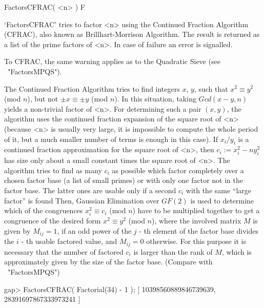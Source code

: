 
\>FactorsCFRAC( <n> ) F

`FactorsCFRAC' tries to factor <n> using the Continued Fraction
Algorithm (CFRAC), also known as Brillhart-Morrison Algorithm. 
The result is returned as a list of the prime factors of <n>.
In case of failure an error is signalled.

To CFRAC, the same warning applies 
as to the Quadratic Sieve (see ~"FactorsMPQS").

The Continued Fraction Algorithm tries to find integers $x$, $y$,
such that $x^2 \equiv y^2$ (mod $n$), but not $\pm x \equiv \pm y$
(mod $n$). In this situation, taking $Gcd(x - y,n)$ yields a 
non-trivial factor of <n>. For determining such a pair $(x,y)$, 
the algorithm uses the continued fraction expansion of the square root
of <n> (because <n> is usually very large, it is impossible to compute
the whole period of it, but a much smaller number of terms is enough
in this case). If $x_i/y_i$ is a
continued fraction approximation for the square root of <n>,
then $c_i := x_i^2 - ny_i^2$ has size only about a small constant times
the square root of <n>.
The algorithm tries to find as many $c_i$ as possible which factor 
completely over a chosen
factor base 
(a list of small primes) or with only one factor not in the factor base.
The latter ones are usable only if a second $c_i$ with the same
``large factor'' is found
Then,
Gaussian Elimination over $GF(2)$ 
is used to determine which of the congruences $x_i^2 \equiv c_i$
(mod $n$) have to be multiplied together to get a congruence
of the desired form  $x^2 \equiv y^2$ (mod $n$), where the involved
matrix $M$ is given by $M_{ij} = 1$, if an odd power of the $j$ - th
element of the factor base divides the $i$ - th usable factored
value, and $M_{ij} = 0$ otherwise.
For this purpose it is necessary that the number of factored 
$c_i$ is larger than the rank of $M$, which is approximately given by
the size of the factor base.
(Compare with ~"FactorsMPQS")

\beginexample
gap> FactorsCFRAC( Factorial(34) - 1 );
[ 10398560889846739639, 28391697867333973241 ]
\endexample


